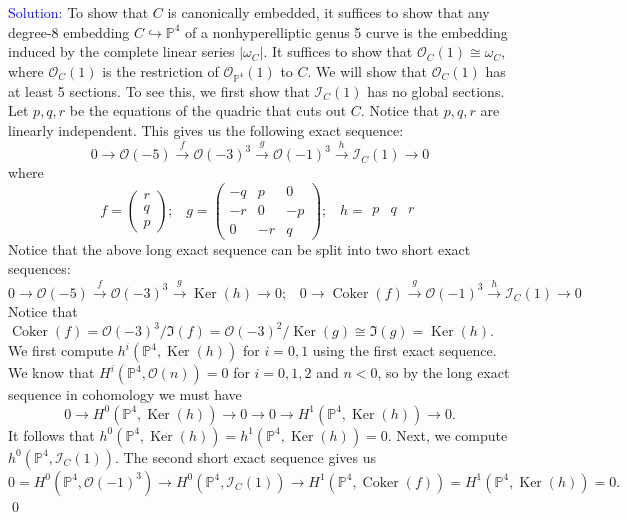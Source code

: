 \documentclass[11pt]{article}
\newcommand{\PP}{\mathbb{P}}
\newcommand{\cI}{\mathcal{I}}
\newcommand{\cO}{\mathcal{O}}
\newcommand{\Ker}{\operatorname{Ker}}
\newcommand{\Coker}{\operatorname{Coker}}
\newenvironment{solution}{\begin{trivlist}\item[]{\textcolor{blue}{Solution:}}}{\qed \end{trivlist}}
\begin{document}
\begin{solution}
    To show that $C$ is canonically embedded, it suffices to show that any degree-8 embedding $C \hookrightarrow \PP^4$ of a nonhyperelliptic genus 5 curve is the embedding induced by the complete linear series $|\omega_C|$. It suffices to show that $\cO_C(1) \cong \omega_C$, where $\cO_C(1)$ is the restriction of $\cO_{\PP^4}(1)$ to $C$. We will show that $\cO_C(1)$ has at least 5 sections. To see this, we first show that $\cI_C(1)$ has no global sections. Let $p, q, r$ be the equations of the quadric that cuts out $C$. Notice that $p, q, r$ are linearly independent. This gives us the following exact sequence:
    \[
        0 \rightarrow \cO(-5) \xrightarrow{f} \cO(-3)^3 \xrightarrow{g} \cO(-1)^3 \xrightarrow{h} \cI_C(1) \rightarrow 0
    \]
    where 
    \[
        f = 
        \begin{pmatrix}
            r \\ q \\ p
        \end{pmatrix} ; \hspace{10pt}
        g = 
        \begin{pmatrix}
            -q & p & 0 \\
            -r & 0 & -p \\
            0 & -r & q
        \end{pmatrix} ; \hspace{10pt}
        h = 
        \begin{matrix}
            p & q & r
        \end{matrix}
    \]
    Notice that the above long exact sequence can be split into two short exact sequences:
    \[
        0 \rightarrow \cO(-5) \xrightarrow{f} \cO(-3)^3 \xrightarrow{g} \Ker(h) \rightarrow 0 ; \hspace{10pt}
        0 \rightarrow \Coker(f) \xrightarrow{g} \cO(-1)^3 \xrightarrow{h} \cI_C(1) \rightarrow 0
    \]
    Notice that $\Coker(f) = \cO(-3)^3 / \Im(f) = \cO(-3)^2 / \Ker(g) \cong \Im(g) = \Ker(h)$. We first compute $h^i(\PP^4, \Ker(h))$ for $i = 0, 1$ using the first exact sequence. We know that $H^i(\PP^4,\cO(n)) = 0$ for $i = 0, 1, 2$ and $n < 0$, so by the long exact sequence in cohomology we must have 
    \[
        0 \rightarrow H^0(\PP^4, \Ker(h)) \rightarrow 0 \rightarrow 0 \rightarrow H^1(\PP^4, \Ker(h)) \rightarrow 0.
    \]
    It follows that $h^0(\PP^4, \Ker(h)) = h^1(\PP^4, \Ker(h)) = 0$. Next, we compute $h^0(\PP^4, \cI_C(1))$. The second short exact sequence gives us 
    \[
        0 = H^0(\PP^4, \cO(-1)^3) \rightarrow H^0(\PP^4, \cI_C(1)) \rightarrow H^1(\PP^4, \Coker(f)) = H^1(\PP^4, \Ker(h)) = 0.
\]
\end{solution}
\end{document}
